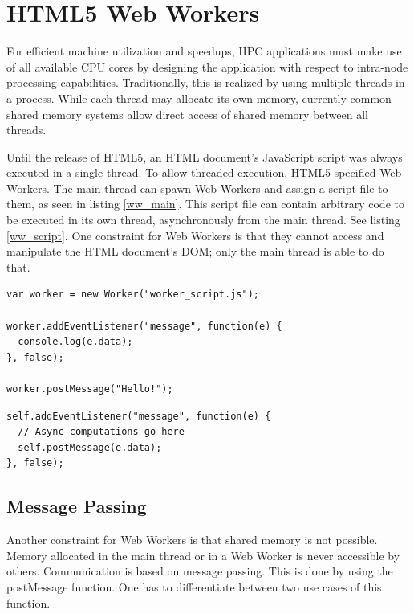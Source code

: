 \section{HTML5 Web Workers} \label{chapter_webworkers}

For efficient machine utilization and speedups, HPC applications must make use of all available CPU cores by designing the application with respect to intra-node processing capabilities. Traditionally, this is realized by using multiple threads in a process. While each thread may allocate its own memory, currently common shared memory systems allow direct access of shared memory between all threads. 

Until the release of HTML5, an HTML document's JavaScript script was always executed in a single thread. To allow threaded execution, HTML5 specified Web Workers. The main thread can spawn Web Workers and assign a script file to them, as seen in listing \ref{ww_main}. This script file can contain arbitrary code to be executed in its own thread, asynchronously from the main thread. See listing \ref{ww_script}. One constraint for Web Workers is that they cannot access and manipulate the HTML document's DOM; only the main thread is able to do that.

\begin{lstlisting}[frame=single,basicstyle=\footnotesize]
var worker = new Worker("worker_script.js");

worker.addEventListener("message", function(e) {
  console.log(e.data);
}, false);

worker.postMessage("Hello!");
\end{lstlisting}

\begin{lstlisting}[frame=single,basicstyle=\footnotesize]
self.addEventListener("message", function(e) {
  // Async computations go here
  self.postMessage(e.data);
}, false);
\end{lstlisting}


\subsection{Message Passing}

Another constraint for Web Workers is that shared memory is not possible. Memory allocated in the main thread or in a Web Worker is never accessible by others. Communication is based on message passing. This is done by using the postMessage function. One has to differentiate between two use cases of this function.

